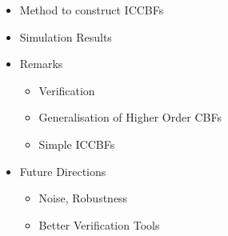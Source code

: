 \documentclass[preview]{standalone}
\begin{document}
\begin{center}
\begin{itemize}
          \item Method to construct ICCBFs
          \item Simulation Results
          \item Remarks
          \begin{itemize}
          \item Verification
          \item Generalisation of Higher Order CBFs
          \item Simple ICCBFs
          \end{itemize}
          \item Future Directions
          \begin{itemize}
          \item Noise, Robustness
          \item Better Verification Tools
          \end{itemize}
          \end{itemize}
\end{center}
\end{document}
